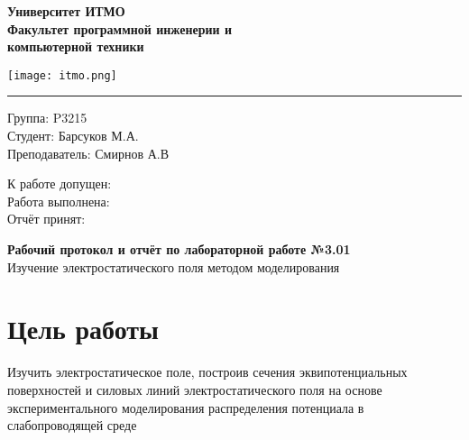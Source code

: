 \documentclass[12pt]{extarticle}
\begin{document}
    \begin{minipage}{0.5\textwidth}
        \begin{center}
            \begin{small}
                \textsf{\textbf{Университет ИТМО}} \\
                \textsf{\textbf{Факультет программной инженерии и}} \\
                \textsf{\textbf{компьютерной техники}}
            \end{small}
        \end{center}
    \end{minipage}
    \hfill
    \begin{minipage}{0.4\textwidth}
        \texttt{[image: itmo.png]}
    \end{minipage}
    \hrule
    \vspace{8mm}
    \begin{minipage}{0.4\textwidth}
        Группа: P3215 \\ %
        Студент: Барсуков М.А. \\ %
        Преподаватель: Смирнов А.В %
    \end{minipage}
    \hfill
    \begin{minipage}{0.4\textwidth}
        К работе допущен: \\
        Работа выполнена: \\
        Отчёт принят: 
    \end{minipage}
    \vspace{8mm}
    \begin{center}
        \begin{Large}
            \textbf{Рабочий протокол и отчёт по лабораторной работе №3.01} \\ %
            Изучение электростатического поля методом моделирования %
        \end{Large}
    \end{center}
    \vspace{8mm}
 
    \section{Цель работы}
    Изучить электростатическое поле, построив сечения эквипотенциальных поверхностей и силовых линий электростатического поля на основе экспериментального моделирования распределения потенциала в слабопроводящей среде
\end{document}
